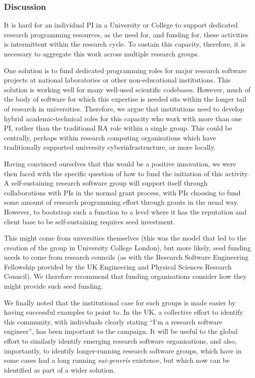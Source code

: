 \subsubsection{Discussion}

It is hard for an individual PI in a University or College
to support dedicated research programming
resources, as the need for, and funding for, these activities is intermittent
within the research cycle. To sustain this capacity, therefore, it is
necessary to aggregate this work across multiple research groups.

One solution is to fund dedicated programming roles for major research software
projects at national laboratories or other non-educational institutions. This
solution is working well for many well-used scientific codebases.
However, much of the body of software for which this expertise is needed sits
within the longer tail of research in universities. Therefore, we argue that
institutions need to develop hybrid academic-technical roles for this capacity
who work with more than one PI, rather than the traditional RA role within a
single group. This could be centrally, perhaps within research computing
organisations which have traditionally supported university cyberinfrastructure,
or more locally.

Having convinced ourselves that this would be a positive innovation, we were
then faced with the specific question of how to fund the initiation of this
activity. A self-sustaining research software group will support itself
through collaborations with PIs in the normal grant process, with PIs choosing
to fund some amount of research programming effort through grants in the usual
way. However, to bootstrap such a function to a level where it has the
reputation and client base to be self-sustaining requires seed investment.

This might come from unversities themselves (this was the model that led to the
creation of the group in University College London), but more likely, seed
funding needs to come from research councils (as with the Research Software
Engineering Fellowship provided by the UK Engineering and Physical Sciences
Research Council). We therefore recommend that funding organisations consider
how they might provide such seed funding.

We finally noted that the institutional case for such groups is made easier
by having successful examples to point to. In the UK, a collective effort to
identify this community, with individuals clearly stating ``I'm a research
software engineer'', has been important to the campaign. It will be useful to
the global effort to similarly identify emerging research software organisations,
and also, importantly, to identify longer-running research software groups,
which have in some cases had a long running \emph{sui-generis} existence, but which
now can be identified as part of a wider solution.

